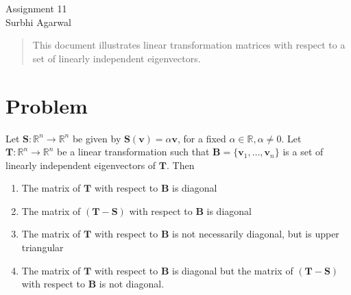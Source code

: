 \documentclass[journal,12pt]{IEEEtran}
\begin{document}
\let\StandardTheFigure\thefigure
\let\vec\mathbf

\renewcommand{\thefigure}{\theproblem}

\def\putbox#1#2#3{\makebox[0in][l]{\makebox[#1][l]{}\raisebox{\baselineskip}[0in][0in]{\raisebox{#2}[0in][0in]{#3}}}}
     \def\rightbox#1{\makebox[0in][r]{#1}}
     \def\centbox#1{\makebox[0in]{#1}}
     \def\topbox#1{\raisebox{-\baselineskip}[0in][0in]{#1}}
     \def\midbox#1{\raisebox{-0.5\baselineskip}[0in][0in]{#1}}
\vspace{3cm}
\begin{center}
\huge Assignment 11\\
\large Surbhi Agarwal\\
\end{center}
\renewcommand{\thefigure}{\theenumi}
\renewcommand{\thetable}{\theenumi}

\begin{abstract}
This document illustrates linear transformation matrices with respect to a set of linearly independent eigenvectors. 
\end{abstract}

\section{Problem}
Let $\vec{S}: \mathbb R^n \rightarrow \mathbb R^n$ be given by $\vec{S}(\vec{v}) = \alpha\vec{v}$, for a fixed $\alpha \in \mathbb R, \alpha \neq 0$. Let $\vec{T}: \mathbb R^n \rightarrow \mathbb R^n$ be a linear transformation such that $\vec{B} = \{ \vec{v}_1,\ldots,\vec{v}_n \}$ is a set of linearly independent eigenvectors of $\vec{T}$. Then
\begin{enumerate}
    \item The matrix of $\vec{T}$ with respect to $\vec{B}$ is diagonal
    \item The matrix of $(\vec{T}-\vec{S})$ with respect to $\vec{B}$ is diagonal
    \item The matrix of $\vec{T}$ with respect to $\vec{B}$ is not necessarily diagonal, but is upper triangular
    \item The matrix of $\vec{T}$ with respect to $\vec{B}$ is diagonal but the matrix of $(\vec{T}-\vec{S})$ with respect to $\vec{B}$ is not diagonal.
\end{enumerate}
\end{document}
